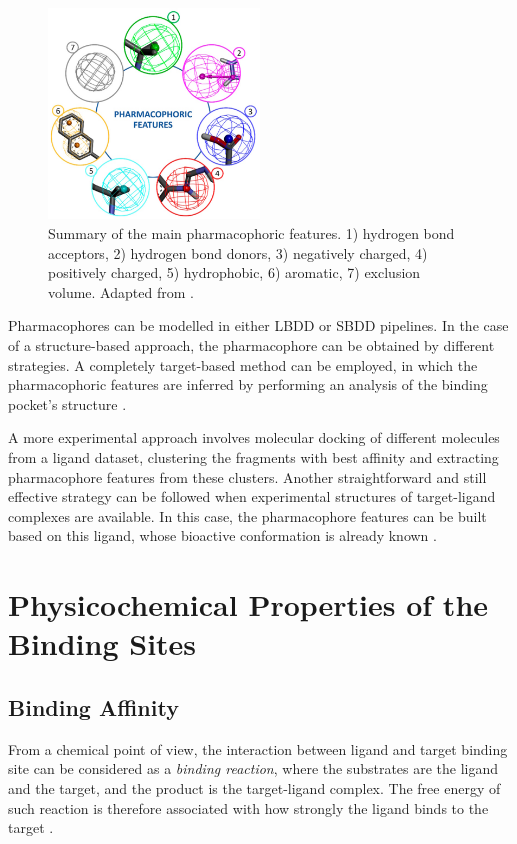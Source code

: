     \begin{figure}[H]
      \centering
      \includegraphics[width=0.5\textwidth]{figures/intro/pharmacophores.jpg}
      \caption{\label{fig:intro/pharmacophores} Summary of the main pharmacophoric features. 1) hydrogen bond acceptors, 2) hydrogen bond donors, 3) negatively charged, 4) positively charged, 5) hydrophobic, 6) aromatic, 7) exclusion volume. Adapted from \cite{pharmacophore_and_VS_2022}.}
    \end{figure}

    Pharmacophores can be modelled in either LBDD or SBDD pipelines. In the case of a structure-based approach, the pharmacophore can be obtained by different strategies. A completely target-based method can be employed, in which the pharmacophoric features are inferred by performing an analysis of the binding pocket's structure \cite{pharmacophore_and_VS_2022, virtual_screening_2019}.

    A more experimental approach involves molecular docking of different molecules from a ligand dataset, clustering the fragments with best affinity and extracting pharmacophore features from these clusters. Another straightforward and still effective strategy can be followed when experimental structures of target-ligand complexes are available. In this case, the pharmacophore features can be built based on this ligand, whose bioactive conformation is already known \cite{virtual_screening_2019}.


\section{Physicochemical Properties of the Binding Sites}
  \subsection{Binding Affinity}
    From a chemical point of view, the interaction between ligand and target binding site can be considered as a \textit{binding reaction}, where the substrates are the ligand and the target, and the product is the target-ligand complex. The free energy of such reaction is therefore associated with how strongly the ligand binds to the target \cite{binding_affinity_2016, binding_affinity_web}.

